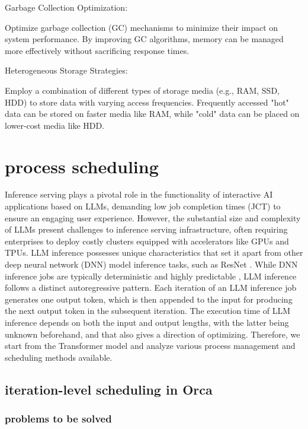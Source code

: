 \documentclass[conference]{IEEEtran}
\begin{document}
Garbage Collection Optimization:

Optimize garbage collection (GC) mechanisms to minimize their impact on system performance. By improving GC algorithms, memory can be managed more effectively without sacrificing response times.

Heterogeneous Storage Strategies:

Employ a combination of different types of storage media (e.g., RAM, SSD, HDD) to store data with varying access frequencies. Frequently accessed "hot" data can be stored on faster media like RAM, while "cold" data can be placed on lower-cost media like HDD.



\section{process scheduling}

Inference serving plays a pivotal role in the functionality of interactive AI applications based on LLMs, demanding low job completion times (JCT) to ensure an engaging user experience. However, the substantial size and complexity of LLMs present challenges to inference serving infrastructure, often requiring enterprises to deploy costly clusters equipped with accelerators like GPUs and TPUs. LLM inference possesses unique characteristics that set it apart from other deep neural network (DNN) model inference tasks, such as ResNet \cite{b15}. While DNN inference jobs are typically deterministic and highly predictable \cite{b16}, LLM inference follows a distinct autoregressive pattern. Each iteration of an LLM inference job generates one output token, which is then appended to the input for producing the next output token in the subsequent iteration. The execution time of LLM inference depends on both the input and output lengths, with the latter being unknown beforehand, and that also gives a direction of optimizing.
Therefore, we start from the Transformer model and analyze various process management and scheduling methods available.


\subsection{iteration-level scheduling in Orca}
\subsubsection{problems to be solved}
\end{document}
